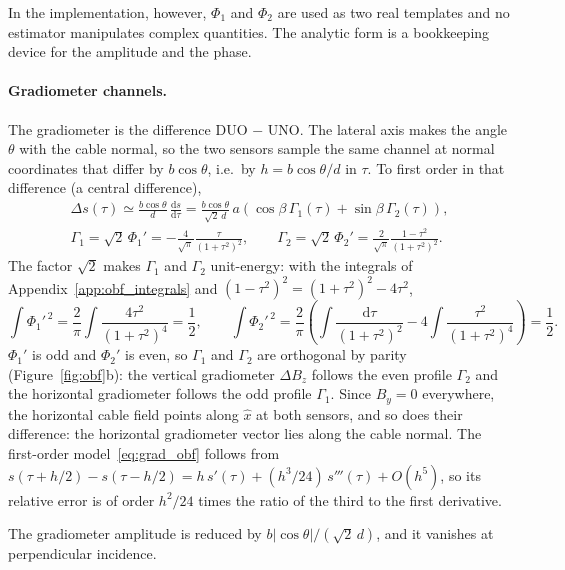 In the implementation, however, $\Phi_1$ and $\Phi_2$ are used as two real templates and no estimator manipulates complex quantities. The analytic form is a bookkeeping device for the amplitude and the phase.

\paragraph{Gradiometer channels.}
The gradiometer is the difference DUO $-$ UNO. The lateral axis makes the angle $\theta$ with the cable normal, so the two sensors sample the same channel at normal coordinates that differ by $b\cos\theta$, i.e.\ by $h = b\cos\theta/d$ in $\tau$. To first order in that difference (a central difference),
\begin{equation}
\begin{gathered}
\Delta s(\tau) \simeq \frac{b\cos\theta}{d}\,\frac{\mathrm{d}s}{\mathrm{d}\tau}
= \frac{b\cos\theta}{\sqrt{2}\,d}\,a\left(\cos\beta\,\Gamma_1(\tau) + \sin\beta\,\Gamma_2(\tau)\right),\\[2pt]
\Gamma_1 = \sqrt{2}\,\Phi_1' = -\frac{4}{\sqrt{\pi}}\frac{\tau}{(1+\tau^{2})^{2}},
\qquad
\Gamma_2 = \sqrt{2}\,\Phi_2' = \frac{2}{\sqrt{\pi}}\frac{1-\tau^{2}}{(1+\tau^{2})^{2}}.
\end{gathered}
\label{eq:grad_obf}
\end{equation}
The factor $\sqrt{2}$ makes $\Gamma_1$ and $\Gamma_2$ unit-energy: with the integrals of Appendix~\ref{app:obf_integrals} and $(1-\tau^{2})^{2} = (1+\tau^{2})^{2} - 4\tau^{2}$,
\[
\int \Phi_1'^{\,2} = \frac{2}{\pi}\int\frac{4\tau^{2}}{(1+\tau^{2})^{4}} = \frac{1}{2},
\qquad
\int \Phi_2'^{\,2} = \frac{2}{\pi}\left(\int\frac{\mathrm{d}\tau}{(1+\tau^{2})^{2}} - 4\int\frac{\tau^{2}}{(1+\tau^{2})^{4}}\right) = \frac{1}{2}.
\]
$\Phi_1'$ is odd and $\Phi_2'$ is even, so $\Gamma_1$ and $\Gamma_2$ are orthogonal by parity (Figure~\ref{fig:obf}b): the vertical gradiometer $\Delta B_z$ follows the even profile $\Gamma_2$ and the horizontal gradiometer follows the odd profile $\Gamma_1$. Since $B_y = 0$ everywhere, the horizontal cable field points along $\hat{x}$ at both sensors, and so does their difference: the horizontal gradiometer vector lies along the cable normal. The first-order model~\eqref{eq:grad_obf} follows from $s(\tau + h/2) - s(\tau - h/2) = h\,s'(\tau) + (h^{3}/24)\,s'''(\tau) + O(h^{5})$, so its relative error is of order $h^{2}/24$ times the ratio of the third to the first derivative.

The gradiometer amplitude is reduced by $b|\cos\theta|/(\sqrt{2}\,d)$, and it vanishes at perpendicular incidence.

